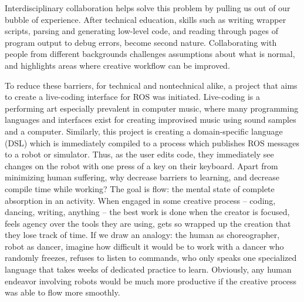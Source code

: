 \documentclass[arts,article,submit,moreauthors,pdftex,10pt,a4paper]{mdpi}
\begin{document}
Interdisciplinary collaboration helps solve this problem by pulling us out of our bubble of
experience. After technical education, skills such as writing wrapper
scripts, parsing and generating low-level code, and reading through pages of
program output to debug errors, become second nature. Collaborating with people
from different backgrounds challenges assumptions about what is normal, and
highlights areas where creative workflow can be improved.


To reduce these barriers, for technical and nontechnical alike, a project that
aims to create a live-coding interface for ROS was initiated. Live-coding is a
performing art especially prevalent in computer music, where many programming
languages and interfaces exist for creating improvised music using sound samples
and a computer. Similarly, this project is creating a domain-specific language
(DSL) which is immediately compiled to a process which publishes ROS messages to
a robot or simulator. Thus, as the user edits code, they immediately see changes
on the robot with one press of a key on their keyboard. Apart from minimizing human suffering, why
decrease barriers to learning, and decrease compile time while working? The goal
is flow: the mental state of complete absorption in an activity. When engaged in
some creative process -- coding, dancing, writing, anything -- the best work is
done when the creator is focused, feels agency over the tools they are using,
gets so wrapped up the creation that they lose track of time. If we draw an
analogy: the human as choreographer, robot as dancer, imagine how difficult it
would be to work with a dancer who randomly freezes, refuses to listen to
commands, who only speaks one specialized language that takes weeks of dedicated
practice to learn. Obviously, any human endeavor involving robots would be much
more productive if the creative process was able to flow more smoothly.
\end{document}
